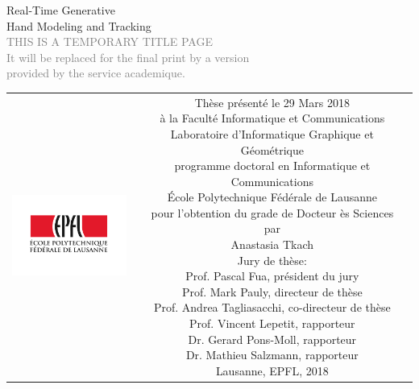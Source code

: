 \begin{titlepage}
\begin{center}
\sffamily


\null\vspace{2cm}
{\huge Real-Time Generative \\[12pt] Hand Modeling and Tracking } \\[24pt] 
\textcolor{gray}{\small{THIS IS A TEMPORARY TITLE PAGE \\ It will be replaced for the final print by a version \\ provided by the service academique.}}
    
\vfill

\begin{tabular} {cc}
\parbox{0.3\textwidth}{\includegraphics[width=4cm]{images/epfl}}
&
\parbox{0.7\textwidth}{%
	Thèse présenté le 29 Mars 2018\\
	à la Faculté Informatique et Communications \\
	Laboratoire d’Informatique Graphique et Géométrique \\
	programme doctoral en Informatique et Communications \\
	École Polytechnique Fédérale de Lausanne\\[6pt]
	pour l'obtention du grade de Docteur ès Sciences\\
	par\\ [4pt]
	\null \hspace{3em} Anastasia Tkach\\[9pt]
%
\small
Jury de thèse:\\[4pt]
%
    Prof. Pascal Fua, président du jury\\
    Prof. Mark Pauly, directeur de thèse\\
    Prof. Andrea Tagliasacchi, co-directeur de thèse\\
    Prof. Vincent Lepetit, rapporteur\\
    Dr. Gerard Pons-Moll, rapporteur\\
    Dr. Mathieu Salzmann, rapporteur\\[12pt]
%
Lausanne, EPFL, 2018}
\end{tabular}
\end{center}
\vspace{2cm}
\end{titlepage}



